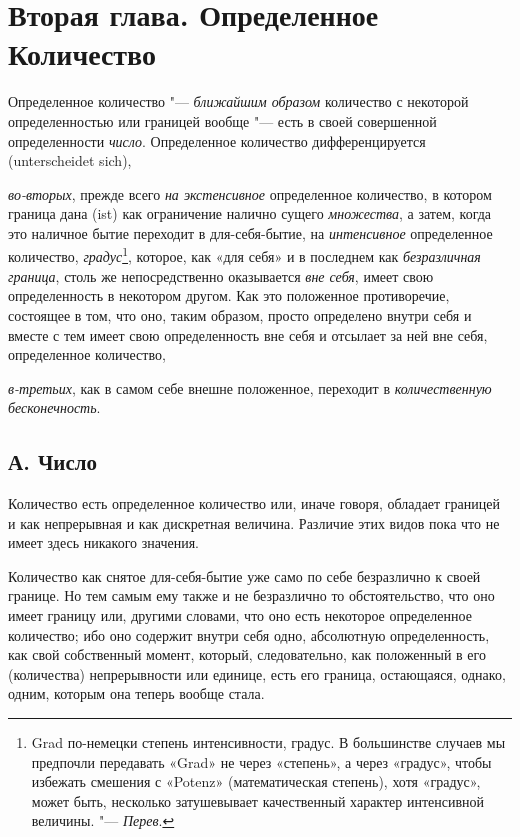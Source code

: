 \chapter[{\em Вторая глава} Определенное Количество]{Вторая глава. Определенное Количество}

Определенное количество "--- {\em ближайшим образом}
количество с некоторой определенностью или границей вообще "--- есть
в своей совершенной определенности {\em число}. Определенное
количество дифференцируется (unterscheidet sich),

{\em во-вторых}, прежде всего
{\em на экстенсивное} определенное количество, в
котором граница дана (ist) как ограничение налично сущего
{\em множества}, а затем, когда это наличное бытие
переходит в для-себя-бытие, на {\em интенсивное}
определенное количество, {\em градус}\footnote{Grad
по-немецки степень интенсивности, градус. В большинстве
случаев мы предпочли передавать «Grad» не через «степень», а через
«градус», чтобы избежать смешения с «Potenz» (математическая степень), хотя
«градус», может быть, несколько затушевывает качественный характер
интенсивной величины. "--- {\em Перев}.}, которое, как «для
себя» и в последнем как {\em безразличная граница},
столь же непосредственно оказывается {\em вне себя},
имеет свою определенность в некотором другом. Как это положенное
противоречие, состоящее в том, что оно, таким образом, просто определено
внутри себя и вместе с тем имеет свою определенность вне себя и отсылает за
ней вне себя, определенное количество,

{\em в-третьих}, как в самом себе внешне положенное,
переходит в {\em количественную бесконечность}.

\section[А. Число]{А. Число}
Количество есть определенное количество или, иначе говоря, обладает границей
и как непрерывная и как дискретная величина. Различие этих видов пока что
не имеет здесь никакого значения.

Количество как снятое для-себя-бытие уже само по себе безразлично к своей
границе. Но тем самым ему также и не безразлично то обстоятельство, что оно
имеет границу или, другими словами, что оно есть некоторое определенное
количество; ибо оно содержит внутри себя одно, абсолютную определенность,
как свой собственный момент, который, следовательно, как положенный в его
(количества) непрерывности или единице, есть его граница, остающаяся,
однако, одним, которым она теперь вообще стала.

